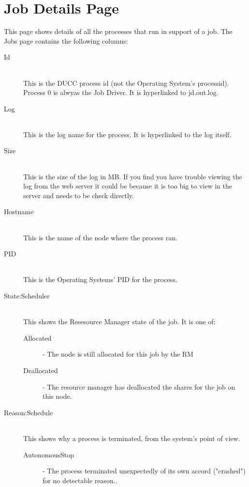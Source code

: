   
    \section{Job Details Page}
    This page shows details of all the processes that run in support of a job. 
    The Jobs page contains the following columns: 

    \begin{description}

        \item[Id] \hfill \\
          This is the DUCC process id (not the Operating System's processid). Process 0 is
          alwyas the Job Driver. It is hyperlinked to jd.out.log.

        \item[Log] \hfill \\
          This is the log name for the process. It is hyperlinked to the log itself.

        \item[Size] \hfill \\
          This is the size of the log in MB. If you find you have trouble viewing the log
          from the web server it could be because it is too big to view in the server and needs to
          be check directly.

        \item[Hostname] \hfill \\
          This is the name of the node where the process ran.

        \item[PID] \hfill \\
          This is the Operating Systems' PID for the process.

        \item[State:Scheduler] \hfill \\
          This shows the Resesource Manager state of the job. It is one of:

          \begin{description}
              \item[Allocated] - The node is still allocated for this job by the RM 
              \item[Deallocated] - The resource manager has deallocated the shares for the job on
                this node.
          \end{description}

        \item[Reason:Schedule] \hfill \\
          This shows why a process is terminated, from the system's point
          of view.
            \begin{description}          
                \item[AutonomousStop] - The process terminated unexpectedly of its own accord ("crashed") for no 
                  detectable reason.. 
                  

\end{description}
\end{description}
